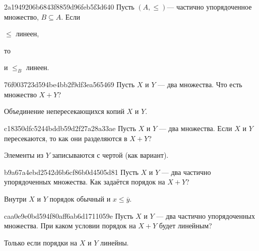 \begin{note}{2a1949206b6843f8859d96feb5f3d640}
    Пусть \({ (A, \leqslant) }\)--- частично упорядоченное множество, \({ B \subseteq A }\).
    Если \begin{icloze}{2}\({ \leqslant }\) линеен,\end{icloze} то \begin{icloze}{1}и \({ \leqslant_{B} }\) линеен.\end{icloze}
\end{note}

\begin{note}{76f003723d594be4bb2f9df3ea565469}
    Пусть \({ X }\) и \({ Y }\) --- два множества.
    Что есть множество \({ X + Y }\)?

    \begin{cloze}{1}
        Объединение непересекающихся копий \({ X }\) и \({ Y }\).
    \end{cloze}
\end{note}

\begin{note}{c18350dfc5244bddb59d2f27a28a33ae}
    Пусть \({ X }\) и \({ Y }\) --- два множества.
    Если \({ X }\) и \({ Y }\) пересекаются, то как они разделяются в \({ X + Y }\)?

    \begin{cloze}{1}
        Элементы из \({ Y }\) записываются с чертой (как вариант).
    \end{cloze}
\end{note}

\begin{note}{b9a67a4ebd2542d6b6cf86b0d4505d81}
    Пусть \({ X }\) и \({ Y }\) --- два частично упорядоченных множества.
    Как задаётся порядок на \({ X + Y }\)?

    \begin{cloze}{1}
        Внутри \({ X }\) и \({ Y }\) порядок обычный и \({ x \leqslant \overline{y} }\).
    \end{cloze}
\end{note}

\begin{note}{caa0e9e0bd594f80aff6ab6d1711059e}
    Пусть \({ X }\) и \({ Y }\) --- два частично упорядоченных множества.
    При каком условии порядок на \({ X + Y }\) будет линейным?

    \begin{cloze}{1}
        Только если порядки на \({ X }\) и \({ Y }\) линейны.
    \end{cloze}
\end{note}

